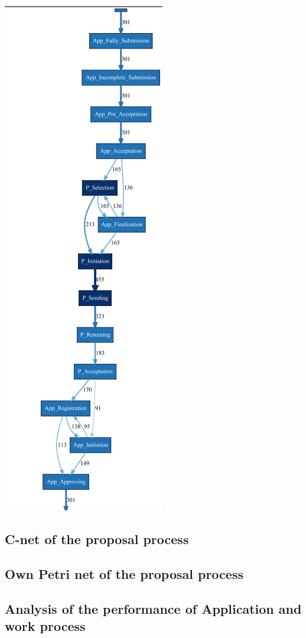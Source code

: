 \includegraphics[]{APP_ApprovedDFG0-3.PNG}

\subsection{C-net of the proposal process}

\subsection{Own Petri net of the proposal process}

\subsection{Analysis of the performance of Application and work process}
